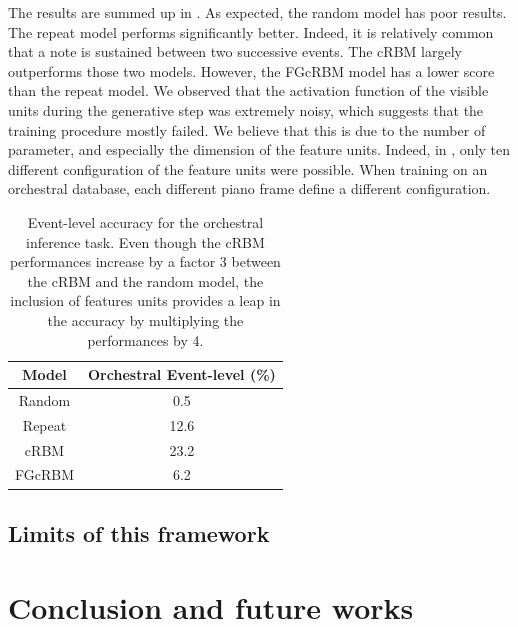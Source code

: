 \documentclass[twoside,twocolumn]{article}
\begin{document}
The results are summed up in . As expected, the random model has poor results. The repeat model performs significantly better. Indeed, it is relatively common that a note is sustained between two successive events. The cRBM largely outperforms those two models. However, the FGcRBM model has a lower score than the repeat model. We observed that the activation function of the visible units during the generative step was extremely noisy, which suggests that the training procedure mostly failed. We believe that this is due to the number of parameter,  and especially the dimension of the feature units. Indeed, in \cite{taylor2009factored}, only ten different configuration of the feature units were possible. When training on an orchestral database,  each different piano frame define a different configuration.

\begin{table}[h]
\centering
\begin{tabular}{c c}
\hline
Model & Orchestral Event-level (\%)\\
\hline
Random & 0.5\\ 
Repeat & 12.6\\
\hline \hline
cRBM & 23.2\\ 
FGcRBM & 6.2\\ 
\end{tabular}
\caption{Event-level accuracy for the orchestral inference task. Even though the cRBM performances increase by a factor 3 between the cRBM and the random model, the inclusion of features units provides a leap in the accuracy by multiplying the performances by 4.}
\label{tab:result_event_level}
\end{table}

\subsection{Limits of this framework}

\section{Conclusion and future works}




\end{document}
